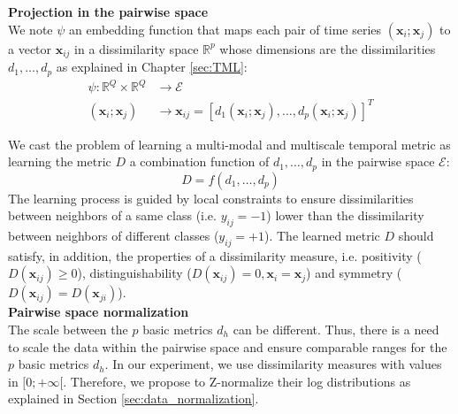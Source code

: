 \noindent \textbf{Projection in the pairwise space} \\
We note $\psi$ an embedding function that maps each pair of time
series $(\textbf{x}_i; \textbf{x}_j)$ to a vector $\textbf{x}_{ij}$ in a dissimilarity space $\mathbb{R}^p$ whose dimensions are the dissimilarities $d_1, \ldots, d_p$ as explained in Chapter \ref{sec:TML}:
\begin{equation}
	\begin{aligned}
	\psi : \mathbb{R}^Q \times \mathbb{R}^Q & \rightarrow \mathcal{E} \\
	(\textbf{x}_i; \textbf{x}_j) & \rightarrow \textbf{x}_{ij} = [d_1(\textbf{x}_i; \textbf{x}_j), \ldots, d_p(\textbf{x}_i; \textbf{x}_j)]^T
	\end{aligned}
	\label{eq:projection}
\end{equation}

We cast the problem of learning a multi-modal and multiscale temporal metric as learning the metric $D$ a combination function of $d_1, \ldots, d_p$ in the pairwise space $\mathcal{E}$:
\begin{equation}
D = f(d_1, \ldots , d_p)
\end{equation}
The learning process is guided by local constraints to ensure dissimilarities between neighbors of a same class (i.e. $y_{ij}=-1$) lower than the dissimilarity between neighbors of different classes ($y_{ij}=+1$). The learned metric $D$ should satisfy, in addition, the properties of a dissimilarity measure, i.e. positivity ($D(\textbf{x}_{ij}) \geq 0$), distinguishability ($D(\textbf{x}_{ij}) = 0 , \textbf{x}_i = \textbf{x}_j$) and symmetry ($D(\textbf{x}_{ij}) = D(\textbf{x}_{ji})$). \\



\noindent \textbf{Pairwise space normalization} \\
The scale between the $p$ basic metrics $d_h$ can be different. Thus, there is a need to scale the data within the pairwise space and ensure comparable ranges for the $p$ basic metrics $d_h$. In our experiment, we use dissimilarity measures with values in $[0;+\infty[$. Therefore, we propose to Z-normalize their log distributions as explained in Section \ref{sec:data_normalization}. \\


